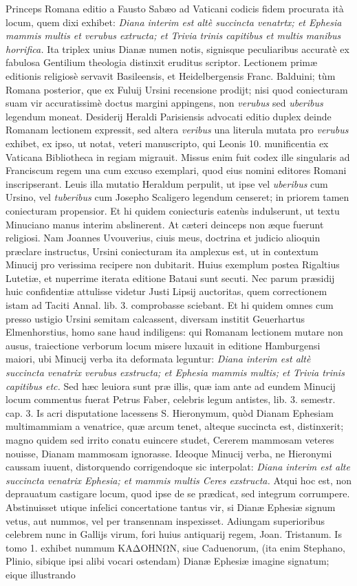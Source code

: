 \documentclass[a4paper, 11pt, oneside, polutonikogreek, latin]{article}
\begin{document}
Princeps Romana editio a Fausto Sabæo ad Vaticani codicis fidem procurata ità locum, quem dixi exhibet: \emph{Diana interim est altè succincta venatrtx; et Ephesia mammis multis et verubus extructa; et Trivia trinis capitibus et multis manibus horrifica.} Ita triplex unius Dianæ numen notis, signisque peculiaribus accuratè ex fabulosa Gentilium theologia distinxit eruditus scriptor. Lectionem primæ editionis religiosè servavit Basileensis, et Heidelbergensis Franc. Balduini; tùm Romana posterior, que ex Fuluij Ursini recensione prodijt; nisi quod coniecturam suam vir accuratissimè doctus margini appingens, non \emph{verubus} sed \emph{uberibus} legendum moneat. Desiderij Heraldi Parisiensis advocati editio duplex deinde Romanam lectionem expressit, sed altera \emph{veribus} una literula mutata pro \emph{verubus} exhibet, ex ipso, ut notat, veteri manuscripto, qui Leonis 10. munificentia ex Vaticana Bibliotheca in regiam migrauit. Missus enim fuit codex ille singularis ad Franciscum regem una cum excuso exemplari, quod eius nomini editores Romani inscripserant. Leuis illa mutatio Heraldum perpulit, ut ipse vel \emph{uberibus} cum Ursino, vel \emph{tuberibus} cum Josepho Scaligero legendum censeret; in priorem tamen coniecturam propensior. Et hi quidem coniecturis eatenùs indulserunt, ut textu Minuciano manus interim abslinerent. At cæteri deinceps non æque fuerunt religiosi. Nam Joannes Uvouverius, ciuis meus, doctrina et judicio alioquin præclare instructus, Ursini coniecturam ita amplexus est, ut in contextum Minucij pro verissima recipere non dubitarit. Huius exemplum postea Rigaltius Lutetiæ, et nuperrime iterata editione Bataui sunt secuti. Nec parum præsidij huic confidentiæ attulisse videtur Justi Lipsij auctoritas, quem correctionem istam ad Taciti Annal. lib. 3. comprobasse sciebant. Et hi quidem omnes cum presso ustigio Ursini semitam calcassent, diversam institit Geuerhartus Elmenhorstius, homo sane haud indiligens: qui Romanam lectionem mutare non ausus, traiectione verborum locum misere luxauit in editione Hamburgensi maiori, ubi Minucij verba ita deformata leguntur: \emph{Diana interim est altè succincta venatrix verubus exstructa; et Ephesia mammis multis; et Trivia trinis capitibus etc.} Sed hæc leuiora sunt præ illis, quæ iam ante ad eundem Minucij locum commentus fuerat Petrus Faber, celebris legum antistes, lib. 3. semestr. cap. 3. Is acri disputatione lacessens S. Hieronymum, quòd Dianam Ephesiam multimammiam a venatrice, quæ arcum tenet, alteque succincta est, distinxerit; magno quidem sed irrito conatu euincere studet, Cererem mammosam veteres nouisse, Dianam mammosam ignorasse. Ideoque Minucij verba, ne Hieronymi caussam iuuent, distorquendo corrigendoque sic interpolat: \emph{Diana interim est alte succincta venatrix Ephesia; et mammis multis Ceres exstructa.} Atqui hoc est, non deprauatum castigare locum, quod ipse de se prædicat, sed integrum corrumpere. Abstinuisset utique infelici concertatione tantus vir, si Dianæ Ephesiæ signum vetus, aut nummos, vel per transennam inspexisset. Adiungam superioribus celebrem nunc in Gallijs virum, fori huius antiquarij regem, Joan. Tristanum. Is tomo 1. exhibet nummum KAΔOHNΩN, siue Caduenorum, (ita enim Stephano, Plinio, sibique ipsi alibi vocari ostendam) Dianæ Ephesiæ imagine signatum; eique illustrando 
\end{document}
